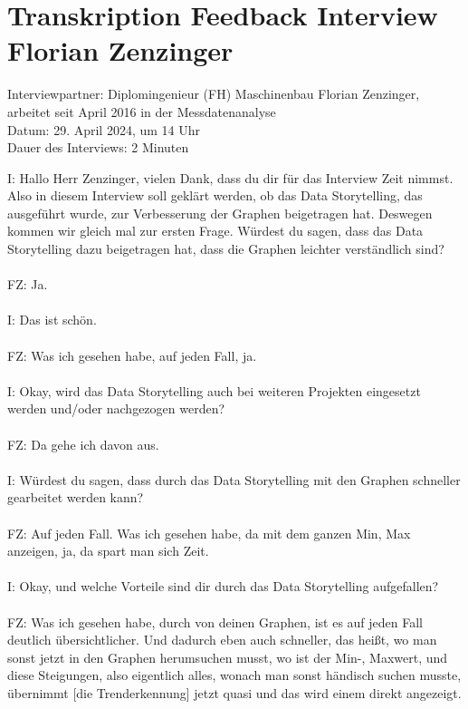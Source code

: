 \section{Transkription Feedback Interview Florian Zenzinger}
\label{appendix:interview_ende_zenzinger}
Interviewpartner: Diplomingenieur (FH) Maschinenbau Florian Zenzinger, arbeitet seit April 2016 in der Messdatenanalyse\\
Datum: 29. April 2024, um 14 Uhr\\
Dauer des Interviews: 2 Minuten\\

\begin{linenumbers}
\noindent
I: Hallo Herr Zenzinger, vielen Dank, dass du dir für das Interview Zeit nimmst. Also in diesem Interview soll geklärt werden, ob das Data Storytelling, das ausgeführt wurde, zur Verbesserung der Graphen beigetragen hat. Deswegen kommen wir gleich mal zur ersten Frage. Würdest du sagen, dass das Data Storytelling dazu beigetragen hat, dass die Graphen leichter verständlich sind?
\\\\
FZ: Ja.
\\\\
I: Das ist schön.
\\\\
FZ: Was ich gesehen habe, auf jeden Fall, ja.
\\\\
I: Okay, wird das Data Storytelling auch bei weiteren Projekten eingesetzt werden und/oder nachgezogen werden?
\\\\
FZ: Da gehe ich davon aus.
\\\\
I: Würdest du sagen, dass durch das Data Storytelling mit den Graphen schneller gearbeitet werden kann?
\\\\
FZ: Auf jeden Fall. Was ich gesehen habe, da mit dem ganzen Min, Max anzeigen, ja, da spart man sich Zeit. 
\\\\
I: Okay, und welche Vorteile sind dir durch das Data Storytelling aufgefallen?
\\\\
FZ: Was ich gesehen habe, durch von deinen Graphen, ist es auf jeden Fall deutlich übersichtlicher. Und dadurch eben auch schneller, das heißt, wo man sonst jetzt in den Graphen herumsuchen musst, wo ist der Min-, Maxwert, und diese Steigungen, also eigentlich alles, wonach man sonst händisch suchen musste, übernimmt [die Trenderkennung] jetzt quasi und das wird einem direkt angezeigt.\\\\

\end{linenumbers}

